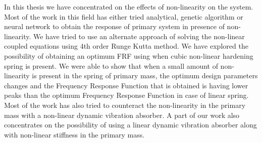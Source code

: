 \newpage
In this thesis we have concentrated on the effects of non-linearity on the system. Most of the work in this field has either tried analytical, genetic algorithm or neural network to obtain the response of primary system in presence of non-linearity. We have tried to use an alternate approach of solving the non-linear coupled equations using 4th order Runge Kutta method. We have explored the possibility of obtaining an optimum FRF using when cubic non-linear hardening spring is present. We were able to show that when a small amount of non-linearity is present in the spring of primary mass, the optimum design parameters changes and the Frequency Response Function that is obtained is having lower peaks than the optimum Frequency Response Function in case of linear spring.
Most of the work has also tried to counteract the non-linearity in the primary mass with a non-linear dynamic vibration absorber. A part of our work also concentrates on the possibility of using a linear dynamic vibration absorber along with non-linear stiffness in the primary mass. 
%